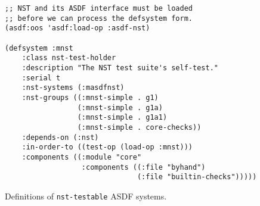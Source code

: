 \begin{figure}
\begin{verbatim}
;; NST and its ASDF interface must be loaded
;; before we can process the defsystem form.
(asdf:oos 'asdf:load-op :asdf-nst)

(defsystem :mnst
    :class nst-test-holder
    :description "The NST test suite's self-test."
    :serial t
    :nst-systems (:masdfnst)
    :nst-groups ((:mnst-simple . g1)
                 (:mnst-simple . g1a)
                 (:mnst-simple . g1a1)
                 (:mnst-simple . core-checks))
    :depends-on (:nst)
    :in-order-to ((test-op (load-op :mnst)))
    :components ((:module "core"
                  :components ((:file "byhand")
                               (:file "builtin-checks")))))
\end{verbatim}
\caption{Definitions of \texttt{nst-testable} ASDF systems.}
\label{fig:asdf}
\end{figure}

